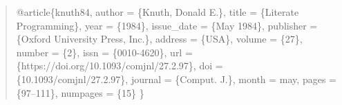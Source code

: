 \documentclass[
  letterpaper,
  DIV=11,
  numbers=noendperiod,
  oneside]{scrreprt}
\newenvironment{Shaded}{\begin{snugshade}}{\end{snugshade}}
\newcommand{\DataTypeTok}[1]{\textcolor[rgb]{0.68,0.00,0.00}{#1}}
\newcommand{\NormalTok}[1]{\textcolor[rgb]{0.00,0.23,0.31}{#1}}
\newcommand{\OtherTok}[1]{\textcolor[rgb]{0.00,0.23,0.31}{#1}}
\newcommand{\StringTok}[1]{\textcolor[rgb]{0.13,0.47,0.30}{#1}}
\newcommand{\VariableTok}[1]{\textcolor[rgb]{0.07,0.07,0.07}{#1}}
\begin{document}
\begin{tcolorbox}
\begin{quote}
\begin{codelisting}[H]
\begin{Shaded}
\begin{Highlighting}[]
\VariableTok{@article}\NormalTok{\{}\OtherTok{knuth84}\NormalTok{,}
  \DataTypeTok{author}\NormalTok{ = \{Knuth, Donald E.\},}
  \DataTypeTok{title}\NormalTok{ = \{Literate Programming\},}
  \DataTypeTok{year}\NormalTok{ = \{1984\},}
  \DataTypeTok{issue\_date}\NormalTok{ = \{May 1984\},}
  \DataTypeTok{publisher}\NormalTok{ = \{Oxford University Press, Inc.\},}
  \DataTypeTok{address}\NormalTok{ = \{USA\},}
  \DataTypeTok{volume}\NormalTok{ = \{27\},}
  \DataTypeTok{number}\NormalTok{ = \{2\},}
  \DataTypeTok{issn}\NormalTok{ = \{0010{-}4620\},}
  \DataTypeTok{url}\NormalTok{ = \{https://doi.org/10.1093/comjnl/27.2.97\},}
  \DataTypeTok{doi}\NormalTok{ = \{10.1093/comjnl/27.2.97\},}
  \DataTypeTok{journal}\NormalTok{ = \{Comput. J.\},}
  \DataTypeTok{month}\NormalTok{ = }\StringTok{may}\NormalTok{,}
  \DataTypeTok{pages}\NormalTok{ = \{97–111\},}
  \DataTypeTok{numpages}\NormalTok{ = \{15\}}
\NormalTok{\}}


\end{Highlighting}
\end{Shaded}
\end{codelisting}
\end{quote}
\end{tcolorbox}
\end{document}
